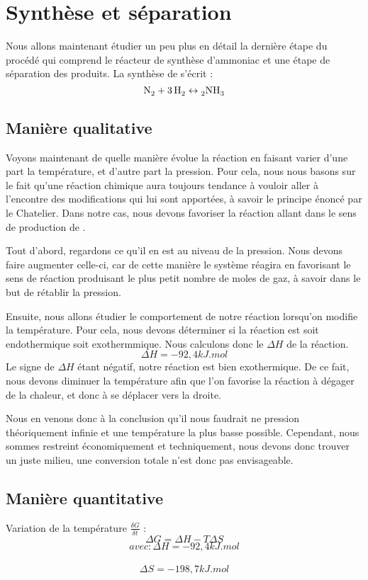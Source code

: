 \documentclass[10pt,a4paper]{article}
\begin{document}
\section{Synthèse  et séparation}

Nous allons maintenant étudier un peu plus en détail la dernière étape du procédé qui comprend le réacteur de synthèse d’ammoniac et une étape de séparation des produits.
La synthèse de  s'écrit :
$$ \ce{N_2 + 3H_2 \leftrightarrow 2NH_3}$$

\subsection{Manière qualitative}
Voyons maintenant de quelle manière évolue la réaction en faisant varier d'une part la température, et d'autre part la pression. Pour cela, nous nous basons sur le fait qu'une réaction chimique aura toujours tendance à vouloir aller à l'encontre des modifications qui lui sont apportées, à savoir le principe énoncé par le Chatelier. Dans notre cas, nous devons favoriser la réaction allant dans le sens de production de .

Tout d'abord, regardons ce qu'il en est au niveau de la pression. Nous devons faire augmenter celle-ci, car de cette manière le système réagira en favorisant le sens de réaction produisant le plus petit nombre de moles de gaz, à savoir  dans le but de rétablir la pression. 

Ensuite, nous allons étudier le comportement de notre réaction lorsqu'on modifie la température. Pour cela, nous devons déterminer si la réaction est soit endothermique soit exothermmique. Nous calculons donc le $\Delta H$  de la réaction. $$\Delta H = \unit{-92,4}{kJ.mol}$$
Le signe de $\Delta H$ étant négatif, notre réaction est bien exothermique. De ce fait, nous devons diminuer la température afin que l'on favorise la réaction à dégager de la chaleur, et donc à se déplacer vers la droite.

Nous en venons donc à la conclusion qu'il nous faudrait ne pression théoriquement infinie et une température la plus basse possible. Cependant, nous sommes restreint économiquement et techniquement, nous devons donc trouver un juste milieu, une conversion totale n'est donc pas envisageable. 

\subsection{Manière quantitative}

Variation de la température $\frac{\delta G}{\delta t}$ :
$$\Delta G = \Delta H - T \Delta S $$
$$ avec: \Delta H = \unit{-92,4}{kJ.mol} $$ \
$$ \Delta S = \unit{-198,7}{kJ.mol} $$

\end{document}
